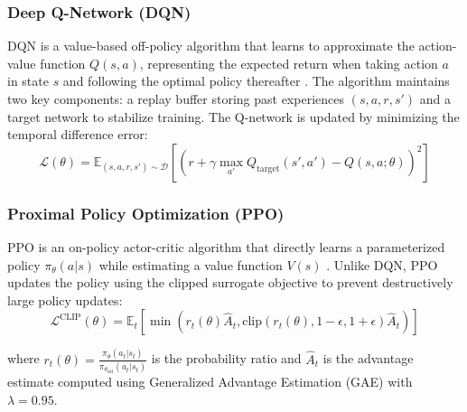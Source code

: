\documentclass{article}
\begin{document}
\subsubsection{Deep Q-Network (DQN)}

DQN is a value-based off-policy algorithm that learns to approximate the action-value function $Q(s, a)$, representing the expected return when taking action $a$ in state $s$ and following the optimal policy thereafter \citep{dqn-paper}. The algorithm maintains two key components: a replay buffer storing past experiences $(s, a, r, s')$ and a target network to stabilize training. The Q-network is updated by minimizing the temporal difference error:
\[
\mathcal{L}(\theta) = \mathbb{E}_{(s,a,r,s') \sim \mathcal{D}}\left[\left(r + \gamma \max_{a'} Q_{\text{target}}(s', a') - Q(s, a; \theta)\right)^2\right]
\]

\subsubsection{Proximal Policy Optimization (PPO)}

PPO is an on-policy actor-critic algorithm that directly learns a parameterized policy $\pi_\theta(a|s)$ while estimating a value function $V(s)$ \citep{ppo-paper}. Unlike DQN, PPO updates the policy using the clipped surrogate objective to prevent destructively large policy updates:
\[
\mathcal{L}^{\text{CLIP}}(\theta) = \mathbb{E}_t\left[\min\left(r_t(\theta)\hat{A}_t, \text{clip}(r_t(\theta), 1-\epsilon, 1+\epsilon)\hat{A}_t\right)\right]
\]

where $r_t(\theta) = \frac{\pi_\theta(a_t|s_t)}{\pi_{\theta_{\text{old}}}(a_t|s_t)}$ is the probability ratio and $\hat{A}_t$ is the advantage estimate computed using Generalized Advantage Estimation (GAE) with $\lambda = 0.95$.
\end{document}
